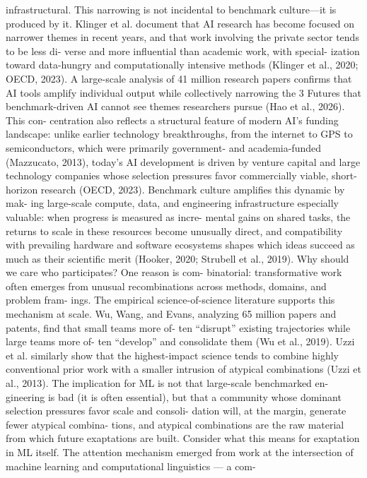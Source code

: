 infrastructural.
This narrowing is not incidental to benchmark culture—it is
produced by it. Klinger et al. document that AI research has
become focused on narrower themes in recent years, and
that work involving the private sector tends to be less di-
verse and more influential than academic work, with special-
ization toward data-hungry and computationally intensive
methods (Klinger et al., 2020; OECD, 2023). A large-scale
analysis of 41 million research papers confirms that AI tools
amplify individual output while collectively narrowing the
3
Futures that benchmark-driven AI cannot see
themes researchers pursue (Hao et al., 2026). This con-
centration also reflects a structural feature of modern AI’s
funding landscape: unlike earlier technology breakthroughs,
from the internet to GPS to semiconductors, which were
primarily government- and academia-funded (Mazzucato,
2013), today’s AI development is driven by venture capital
and large technology companies whose selection pressures
favor commercially viable, short-horizon research (OECD,
2023). Benchmark culture amplifies this dynamic by mak-
ing large-scale compute, data, and engineering infrastructure
especially valuable: when progress is measured as incre-
mental gains on shared tasks, the returns to scale in these
resources become unusually direct, and compatibility with
prevailing hardware and software ecosystems shapes which
ideas succeed as much as their scientific merit (Hooker,
2020; Strubell et al., 2019).
Why should we care who participates? One reason is com-
binatorial: transformative work often emerges from unusual
recombinations across methods, domains, and problem fram-
ings. The empirical science-of-science literature supports
this mechanism at scale. Wu, Wang, and Evans, analyzing
65 million papers and patents, find that small teams more of-
ten “disrupt” existing trajectories while large teams more of-
ten “develop” and consolidate them (Wu et al., 2019). Uzzi
et al. similarly show that the highest-impact science tends
to combine highly conventional prior work with a smaller
intrusion of atypical combinations (Uzzi et al., 2013). The
implication for ML is not that large-scale benchmarked en-
gineering is bad (it is often essential), but that a community
whose dominant selection pressures favor scale and consoli-
dation will, at the margin, generate fewer atypical combina-
tions, and atypical combinations are the raw material from
which future exaptations are built.
Consider what this means for exaptation in ML itself. The
attention mechanism emerged from work at the intersection
of machine learning and computational linguistics — a com-
